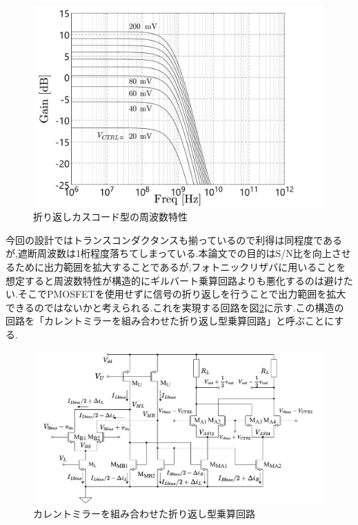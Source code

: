         \begin{figure}[!b]
            \centering
            \includegraphics[width=0.99\textwidth]{figures/chapter3/folded_ac.pdf}
            \caption{折り返しカスコード型の周波数特性}
            \label{fig:3_folded_gilbert_ac}
        \end{figure}
        \clearpage
        今回の設計ではトランスコンダクタンスも揃っているので利得は同程度であるが,遮断周波数は1桁程度落ちてしまっている.本論文での目的はS/N比を向上させるために出力範囲を拡大することであるが,フォトニックリザバに用いることを想定すると周波数特性が構造的にギルバート乗算回路よりも悪化するのは避けたい.そこでPMOSFETを使用せずに信号の折り返しを行うことで出力範囲を拡大できるのではないかと考えられる.これを実現する回路を図\ref{fig:3_folded_mirror_gilbert}に示す.この構造の回路を「カレントミラーを組み合わせた折り返し型乗算回路」と呼ぶことにする.\par
        \begin{figure}[!b]
            \begin{center}
                \includegraphics[width=0.99\textwidth]{figures/chapter3/NtoNFolded.pdf}
                \caption{カレントミラーを組み合わせた折り返し型乗算回路}
                \label{fig:3_folded_mirror_gilbert}
            \end{center}
        \end{figure}
